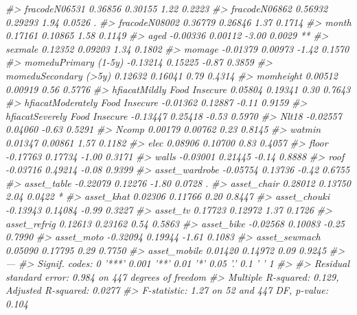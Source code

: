\documentclass[12pt, krantz2,]{book}
\newenvironment{Shaded}{\begin{snugshade}}{\end{snugshade}}
\newcommand{\CommentTok}[1]{\textcolor[rgb]{0.56,0.35,0.01}{\textit{#1}}}
\theoremstyle{definition}
\theoremstyle{definition}
\theoremstyle{definition}
\newcommand{\1}{\mathbbm{1}}
\begin{document}
\begin{Shaded}
\begin{Highlighting}[]
\CommentTok{#> fracodeN06531                    0.36856    0.30155    1.22   0.2223   }
\CommentTok{#> fracodeN06862                    0.56932    0.29293    1.94   0.0526 . }
\CommentTok{#> fracodeN08002                    0.36779    0.26846    1.37   0.1714   }
\CommentTok{#> month                            0.17161    0.10865    1.58   0.1149   }
\CommentTok{#> aged                            -0.00336    0.00112   -3.00   0.0029 **}
\CommentTok{#> sexmale                          0.12352    0.09203    1.34   0.1802   }
\CommentTok{#> momage                          -0.01379    0.00973   -1.42   0.1570   }
\CommentTok{#> momeduPrimary (1-5y)            -0.13214    0.15225   -0.87   0.3859   }
\CommentTok{#> momeduSecondary (>5y)            0.12632    0.16041    0.79   0.4314   }
\CommentTok{#> momheight                        0.00512    0.00919    0.56   0.5776   }
\CommentTok{#> hfiacatMildly Food Insecure      0.05804    0.19341    0.30   0.7643   }
\CommentTok{#> hfiacatModerately Food Insecure -0.01362    0.12887   -0.11   0.9159   }
\CommentTok{#> hfiacatSeverely Food Insecure   -0.13447    0.25418   -0.53   0.5970   }
\CommentTok{#> Nlt18                           -0.02557    0.04060   -0.63   0.5291   }
\CommentTok{#> Ncomp                            0.00179    0.00762    0.23   0.8145   }
\CommentTok{#> watmin                           0.01347    0.00861    1.57   0.1182   }
\CommentTok{#> elec                             0.08906    0.10700    0.83   0.4057   }
\CommentTok{#> floor                           -0.17763    0.17734   -1.00   0.3171   }
\CommentTok{#> walls                           -0.03001    0.21445   -0.14   0.8888   }
\CommentTok{#> roof                            -0.03716    0.49214   -0.08   0.9399   }
\CommentTok{#> asset_wardrobe                  -0.05754    0.13736   -0.42   0.6755   }
\CommentTok{#> asset_table                     -0.22079    0.12276   -1.80   0.0728 . }
\CommentTok{#> asset_chair                      0.28012    0.13750    2.04   0.0422 * }
\CommentTok{#> asset_khat                       0.02306    0.11766    0.20   0.8447   }
\CommentTok{#> asset_chouki                    -0.13943    0.14084   -0.99   0.3227   }
\CommentTok{#> asset_tv                         0.17723    0.12972    1.37   0.1726   }
\CommentTok{#> asset_refrig                     0.12613    0.23162    0.54   0.5863   }
\CommentTok{#> asset_bike                      -0.02568    0.10083   -0.25   0.7990   }
\CommentTok{#> asset_moto                      -0.32094    0.19944   -1.61   0.1083   }
\CommentTok{#> asset_sewmach                    0.05090    0.17795    0.29   0.7750   }
\CommentTok{#> asset_mobile                     0.01420    0.14972    0.09   0.9245   }
\CommentTok{#> ---}
\CommentTok{#> Signif. codes:  0 '***' 0.001 '**' 0.01 '*' 0.05 '.' 0.1 ' ' 1}
\CommentTok{#> }
\CommentTok{#> Residual standard error: 0.984 on 447 degrees of freedom}
\CommentTok{#> Multiple R-squared:  0.129,  Adjusted R-squared:  0.0277 }
\CommentTok{#> F-statistic: 1.27 on 52 and 447 DF,  p-value: 0.104}
\end{Highlighting}
\end{Shaded}
\end{document}
